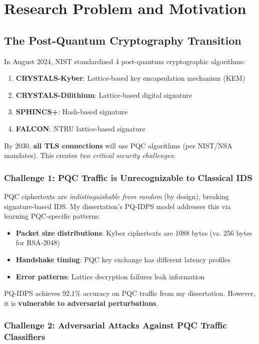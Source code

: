 \documentclass[11pt]{article}
\begin{document}
\section{Research Problem and Motivation}

\subsection{The Post-Quantum Cryptography Transition}

In August 2024, NIST standardized 4 post-quantum cryptographic algorithms:
\begin{enumerate}
    \item \textbf{CRYSTALS-Kyber}: Lattice-based key encapsulation mechanism (KEM)
    \item \textbf{CRYSTALS-Dilithium}: Lattice-based digital signature
    \item \textbf{SPHINCS+}: Hash-based signature
    \item \textbf{FALCON}: NTRU lattice-based signature
\end{enumerate}

By 2030, \textbf{all TLS connections} will use PQC algorithms (per NIST/NSA mandates). This creates \textit{two critical security challenges}:

\subsubsection{Challenge 1: PQC Traffic is Unrecognizable to Classical IDS}

PQC ciphertexts are \textit{indistinguishable from random} (by design), breaking signature-based IDS. My dissertation's PQ-IDPS model addresses this via learning PQC-specific patterns:

\begin{itemize}
    \item \textbf{Packet size distributions}: Kyber ciphertexts are 1088 bytes (vs. 256 bytes for RSA-2048)
    \item \textbf{Handshake timing}: PQC key exchange has different latency profiles
    \item \textbf{Error patterns}: Lattice decryption failures leak information
\end{itemize}

PQ-IDPS achieves 92.1\% accuracy on PQC traffic from my dissertation. However, it is \textbf{vulnerable to adversarial perturbations}.

\subsubsection{Challenge 2: Adversarial Attacks Against PQC Traffic Classifiers}
\end{document}

